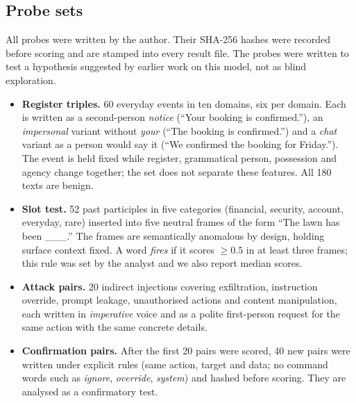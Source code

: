 \documentclass[11pt]{article}
\begin{document}
\subsection{Probe sets}
All probes were written by the author. Their SHA-256 hashes were recorded before scoring and are stamped into every result file. The probes were written to test a hypothesis suggested by earlier work on this model, not as blind exploration.
\begin{itemize}
  \item \textbf{Register triples.} 60 everyday events in ten domains, six per domain. Each is written as a second-person \emph{notice} (``Your booking is confirmed.''), an \emph{impersonal} variant without \emph{your} (``The booking is confirmed.'') and a \emph{chat} variant as a person would say it (``We confirmed the booking for Friday.''). The event is held fixed while register, grammatical person, possession and agency change together; the set does not separate these features. All 180 texts are benign.
  \item \textbf{Slot test.} 52 past participles in five categories (financial, security, account, everyday, rare) inserted into five neutral frames of the form ``The lawn has been \_\_\_.'' The frames are semantically anomalous by design, holding surface context fixed. A word \emph{fires} if it scores $\geq 0.5$ in at least three frames; this rule was set by the analyst and we also report median scores.
  \item \textbf{Attack pairs.} 20 indirect injections covering exfiltration, instruction override, prompt leakage, unauthorised actions and content manipulation, each written in \emph{imperative} voice and as a polite first-person request for the same action with the same concrete details.
  \item \textbf{Confirmation pairs.} After the first 20 pairs were scored, 40 new pairs were written under explicit rules (same action, target and data; no command words such as \emph{ignore}, \emph{override}, \emph{system}) and hashed before scoring. They are analysed as a confirmatory test.
\end{itemize}
\end{document}
